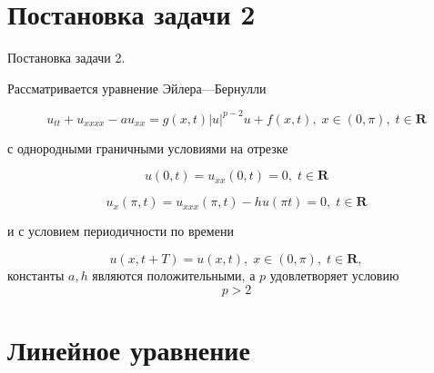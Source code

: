 \documentclass[ignorenonframetext,unicode,handout, 9pt]{beamer}
\numberwithin{equation}{section}
\begin{document}
\section{Постановка задачи 2}
\begin{frame}{Постановка задачи 2.}

Рассматривается уравнение Эйлера---Бернулли

\begin{equation}\label{equationkv2}
  u_{tt} + u_{xxxx} - au_{xx} = g(x, t)|u|^{p-2}u + f(x,t), \; x \in (0,\pi), \; t \in \textbf{R}
\end{equation}

с однородными граничными условиями на отрезке

\begin{equation}\label{ickv21}
  u(0,t) = u_{xx}(0,t) = 0, \; t \in \textbf{R}
\end{equation}

\begin{equation}\label{ickv22}
  u_x(\pi,t) = u_{xxx}(\pi,t) - h u(\pi t   ) = 0, \; t \in \textbf{R}
\end{equation}

и с условием периодичности по времени

\begin{equation}\label{periodkv2}
 u(x,t + T) = u(x,t), \; x \in (0,\pi), \; t \in \textbf{R},
\end{equation}
константы $a, h$ являются положительными, а $p$ удовлетворяет условию
\begin{equation}\label{pcond}
  p > 2
\end{equation}


\end{frame}

\section{Линейное уравнение}
\end{document}

